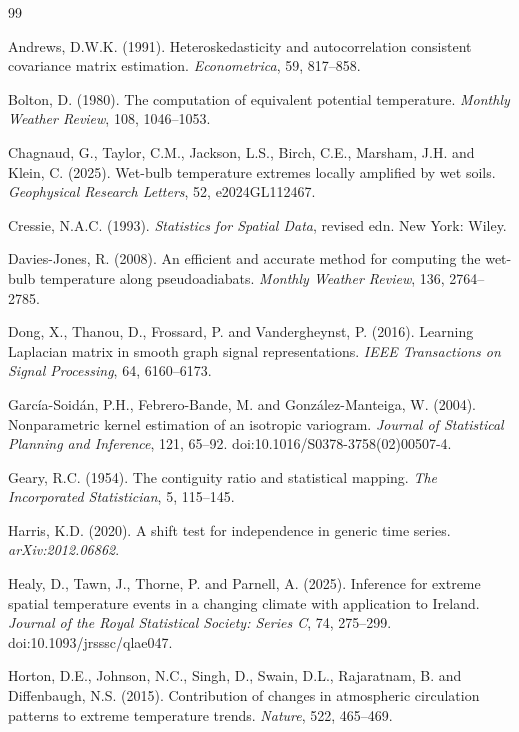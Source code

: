 \documentclass[namedate,webpdf,modern,mediumone]{oup-authoring-template}
\begin{document}
\small
\FloatBarrier
\begin{thebibliography}{99}

Andrews, D.W.K. (1991). Heteroskedasticity and autocorrelation consistent
covariance matrix estimation. \textit{Econometrica}, 59, 817--858.

Bolton, D. (1980). The computation of equivalent potential temperature.
\textit{Monthly Weather Review}, 108, 1046--1053.

Chagnaud, G., Taylor, C.M., Jackson, L.S., Birch, C.E., Marsham, J.H. and
Klein, C. (2025). Wet-bulb temperature extremes locally amplified by wet
soils. \textit{Geophysical Research Letters}, 52, e2024GL112467.

Cressie, N.A.C. (1993). \textit{Statistics for Spatial Data}, revised edn.
New York: Wiley.

Davies-Jones, R. (2008). An efficient and accurate method for computing the
wet-bulb temperature along pseudoadiabats. \textit{Monthly Weather Review},
136, 2764--2785.

Dong, X., Thanou, D., Frossard, P. and Vandergheynst, P. (2016). Learning
Laplacian matrix in smooth graph signal representations.
\textit{IEEE Transactions on Signal Processing}, 64, 6160--6173.

Garc\'ia-Soid\'an, P.H., Febrero-Bande, M. and Gonz\'alez-Manteiga, W.
(2004). Nonparametric kernel estimation of an isotropic variogram.
\textit{Journal of Statistical Planning and Inference}, 121, 65--92.
doi:10.1016/S0378-3758(02)00507-4.

Geary, R.C. (1954). The contiguity ratio and statistical mapping.
\textit{The Incorporated Statistician}, 5, 115--145.

Harris, K.D. (2020). A shift test for independence in generic time series.
\textit{arXiv:2012.06862}.

Healy, D., Tawn, J., Thorne, P. and Parnell, A. (2025). Inference for extreme
spatial temperature events in a changing climate with application to Ireland.
\textit{Journal of the Royal Statistical Society: Series C}, 74, 275--299.
doi:10.1093/jrsssc/qlae047.

Horton, D.E., Johnson, N.C., Singh, D., Swain, D.L., Rajaratnam, B. and
Diffenbaugh, N.S. (2015). Contribution of changes in atmospheric circulation
patterns to extreme temperature trends. \textit{Nature}, 522, 465--469.


\end{thebibliography}
\end{document}
